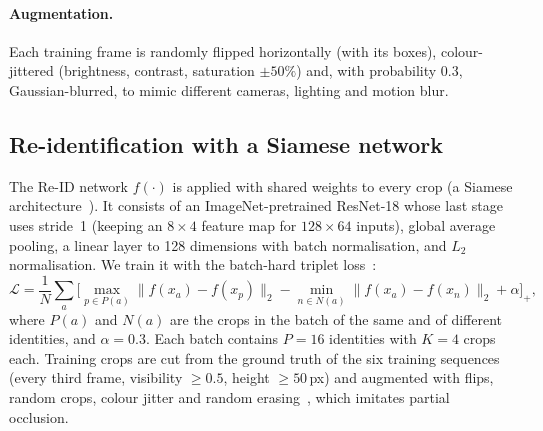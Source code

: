 \documentclass[11pt,letterpaper]{article}
\begin{document}
\paragraph{Augmentation.} Each training frame is randomly flipped horizontally (with its boxes), colour-jittered (brightness, contrast, saturation $\pm50\%$) and, with probability 0.3, Gaussian-blurred, to mimic different cameras, lighting and motion blur.

\subsection{Re-identification with a Siamese network}
The Re-ID network $f(\cdot)$ is applied with shared weights to every crop (a Siamese architecture~\cite{taigman2014deepface}). It consists of an ImageNet-pretrained ResNet-18 whose last stage uses stride~1 (keeping an $8\times4$ feature map for $128\times64$ inputs), global average pooling, a linear layer to 128 dimensions with batch normalisation, and $L_2$ normalisation. We train it with the batch-hard triplet loss~\cite{hermans2017triplet}:
\begin{equation}
\mathcal{L} = \frac{1}{N}\sum_{a}\Big[\max_{p\in P(a)}\|f(x_a)-f(x_p)\|_2 - \min_{n\in N(a)}\|f(x_a)-f(x_n)\|_2 + \alpha\Big]_+ ,
\end{equation}
where $P(a)$ and $N(a)$ are the crops in the batch of the same and of different identities, and $\alpha=0.3$. Each batch contains $P=16$ identities with $K=4$ crops each. Training crops are cut from the ground truth of the six training sequences (every third frame, visibility $\ge 0.5$, height $\ge 50$\,px) and augmented with flips, random crops, colour jitter and random erasing~\cite{zhong2020erasing}, which imitates partial occlusion.
\end{document}
